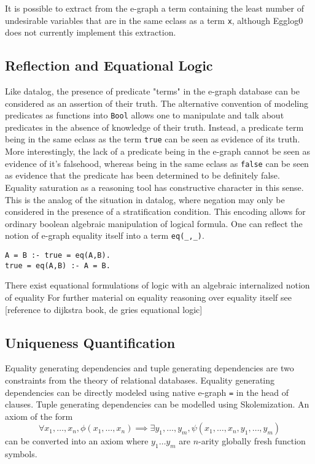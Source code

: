\documentclass[sigplan,10pt,review,anonymous]{acmart}
\begin{document}
It is possible to extract from the e-graph a term containing the least number of undesirable variables that are in the same eclass as a term \lstinline{x}, although Egglog0 does not currently implement this extraction.

\subsection{Reflection and Equational Logic}
Like datalog, the presence of predicate "terms" in the e-graph database can be considered as an assertion of their truth. The alternative convention of modeling predicates as functions into \lstinline{Bool} allows one to manipulate and talk about predicates in the absence of knowledge of their truth. Instead, a predicate term being in the same eclass as the term \lstinline{true} can be seen as evidence of its truth. More interestingly, the lack of a predicate being in the e-graph cannot be seen as evidence of it's falsehood, whereas being in the same eclass as \lstinline{false} can be seen as evidence that the predicate has been determined to be definitely false. Equality saturation as a reasoning tool has constructive character in this sense. This is the analog of the situation in datalog, where negation may only be considered in the presence of a stratification condition.
This encoding allows for ordinary boolean algebraic manipulation of logical formula.
One can reflect the notion of e-graph equality itself into a term \lstinline{eq(_,_)}.

\begin{lstlisting}
A = B :- true = eq(A,B).
true = eq(A,B) :- A = B.

\end{lstlisting}
There exist equational formulations of logic with an algebraic internalized notion of equality
For further material on equality reasoning over equality itself see [reference to dijkstra book, de gries equational logic]

\subsection{Uniqueness Quantification}
Equality generating dependencies and tuple generating dependencies are two constraints from the theory of relational databases.
Equality generating dependencies can be directly modeled using native e-graph \lstinline{=} in the head of clauses.
Tuple generating dependencies can be modelled using Skolemization.
An axiom of the form $$ \forall x_1, \ldots, x_n, \phi(x_1, \ldots , x_n) \implies \exists y_1, \ldots, y_m,  \psi(x_1,\ldots,x_n, y_1,\ldots, y_m) $$
can be converted into an axiom where $y_1 \ldots y_m$ are $n$-arity globally fresh function symbols.
\end{document}
